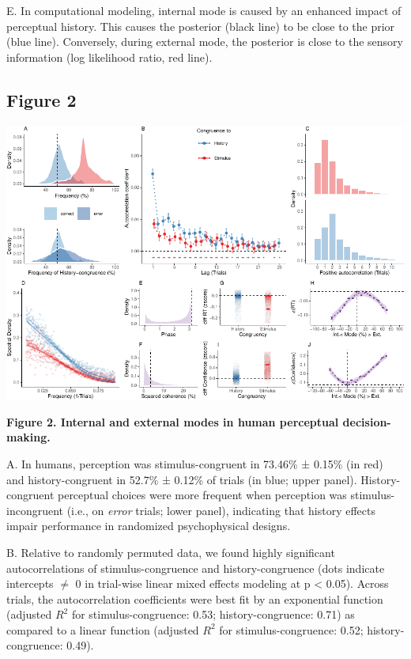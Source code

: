 \documentclass[
]{article}
\begin{document}
E. In computational modeling, internal mode is caused by an enhanced
impact of perceptual history. This causes the posterior (black line) to
be close to the prior (blue line). Conversely, during external mode, the
posterior is close to the sensory information (log likelihood ratio, red
line).

\newpage

\hypertarget{figure-2}{%
\subsection{Figure 2}\label{figure-2}}

\includegraphics{modes_mouse_files/figure-latex/Figure_2-1.pdf}

\textbf{Figure 2. Internal and external modes in human perceptual
decision-making.}

A. In humans, perception was stimulus-congruent in 73.46\% ± 0.15\% (in
red) and history-congruent in 52.7\% ± 0.12\% of trials (in blue; upper
panel). History-congruent perceptual choices were more frequent when
perception was stimulus-incongruent (i.e., on \emph{error} trials; lower
panel), indicating that history effects impair performance in randomized
psychophysical designs.

B. Relative to randomly permuted data, we found highly significant
autocorrelations of stimulus-congruence and history-congruence (dots
indicate intercepts \(\neq\) 0 in trial-wise linear mixed effects
modeling at p \textless{} 0.05). Across trials, the autocorrelation
coefficients were best fit by an exponential function (adjusted \(R^2\)
for stimulus-congruence: 0.53; history-congruence: 0.71) as compared to
a linear function (adjusted \(R^2\) for stimulus-congruence: 0.52;
history-congruence: 0.49).
\end{document}
